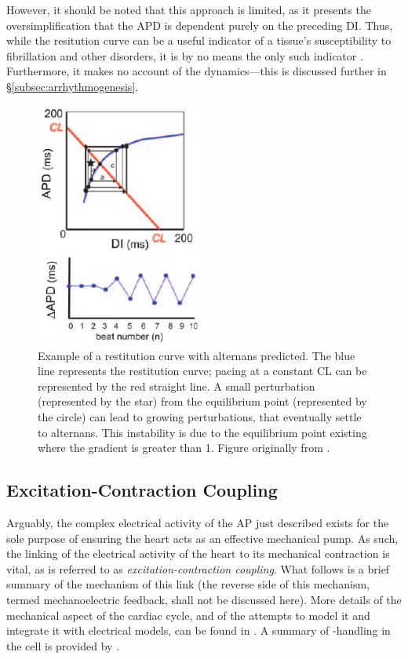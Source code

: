 \documentclass[../thesis-main.tex]{subfiles}
\begin{document}
However, it should be noted that this approach is limited, as it presents the oversimplification that the APD is dependent purely on the preceding DI. Thus, while the resitution curve can be a useful indicator of a tissue's susceptibility to fibrillation and other disorders, it is by no means the only such indicator \citep{Riccio1999}. Furthermore, it makes no account of the \cai{} dynamics---this is discussed further in \S\ref{subsec:arrhythmogenesis}.
\begin{figure}
 \centering
 \includegraphics[width=0.5\textwidth]{alternans-restitutionCurve}
 \caption[Example of a restitution curve with alternans predicted]{Example of a restitution curve with alternans predicted. The blue line represents the restitution curve; pacing at a constant CL can be represented by the red straight line. A small perturbation (represented by the star) from the equilibrium point (represented by the circle) can lead to growing perturbations, that eventually settle to alternans. This instability is due to the equilibrium point existing where the gradient is greater than 1. Figure originally from \citet{Weiss2006}.}
 \label{fig:alternans-restitutionCurve}
\end{figure}

\subsection{Excitation-Contraction Coupling}
\label{subsec:ecc}
Arguably, the complex electrical activity of the AP just described exists for the sole purpose of ensuring the heart acts as an effective mechanical pump. As such, the linking of the electrical activity of the heart to its mechanical contraction is vital, as is referred to as \emph{excitation-contraction coupling}. What follows is a brief summary of the mechanism of this link (the reverse side of this mechanism, termed mechanoelectric feedback, shall not be discussed here). More details of the mechanical aspect of the cardiac cycle, and of the attempts to model it and integrate it with electrical models, can be found in \citet{Trayanova2011}. A summary of \ca{}-handling in the cell is provided by \citet{Eisner2000}.
\end{document}
